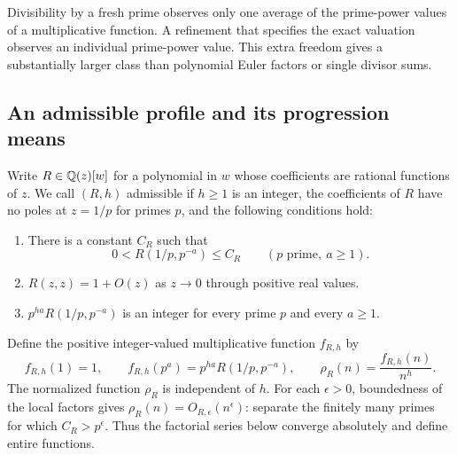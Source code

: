 Divisibility by a fresh prime observes only one average of the
prime-power values of a multiplicative function.  A refinement that
specifies the exact valuation observes an individual prime-power
value.  This extra freedom gives a substantially larger class than
polynomial Euler factors or single divisor sums.

\subsection{An admissible profile and its progression means}

Write $R\in\mathbb Q(z)[w]$ for a polynomial in $w$ whose coefficients are
rational functions of $z$.  We call $(R,h)$ admissible if $h\geq1$
is an integer, the coefficients of $R$ have no poles at $z=1/p$
for primes $p$, and the following conditions hold:
\begin{enumerate}
\item There is a constant $C_R$ such that
\[
 0<R(1/p,p^{-a})\leq C_R\qquad(p\text{ prime},\ a\geq1).
\]
\item $R(z,z)=1+O(z)$ as $z\to0$ through positive real values.
\item $p^{ha}R(1/p,p^{-a})$ is an integer for every prime $p$
and every $a\geq1$.
\end{enumerate}
Define the positive integer-valued multiplicative function $f_{R,h}$ by
\begin{equation}\label{eq:profile-f}
 f_{R,h}(1)=1,\qquad f_{R,h}(p^a)=p^{ha}R(1/p,p^{-a}),
 \qquad \rho_R(n)=\frac{f_{R,h}(n)}{n^h}.
\end{equation}
The normalized function $\rho_R$ is independent of $h$.  For each
$\epsilon>0$, boundedness of the local factors gives
$\rho_R(n)=O_{R,\epsilon}(n^\epsilon)$: separate the finitely many
primes for which $C_R>p^\epsilon$.  Thus the factorial series below
converge absolutely and define entire functions.


